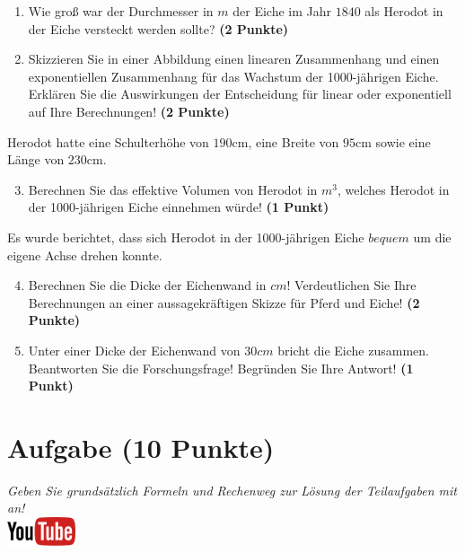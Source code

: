 \documentclass[a4paper, 9pt]{scrartcl}\usepackage[]{graphicx}\usepackage[]{xcolor}
\begin{document}
\begin{enumerate}
\item Wie gro{\ss} war der Durchmesser in $m$ der Eiche im Jahr $1840$ als
  Herodot in der Eiche versteckt werden sollte?
  \textbf{(2 Punkte)}
\item Skizzieren Sie in einer Abbildung einen linearen Zusammenhang und einen
exponentiellen Zusammenhang f{\"u}r das Wachstum der 1000-j{\"a}hrigen Eiche. Erkl{\"a}ren Sie die
Auswirkungen der Entscheidung f{\"u}r linear oder exponentiell auf Ihre
Berechnungen! \textbf{(2 Punkte)}
\end{enumerate}
 
Herodot hatte eine Schulterh{\"o}he von $190$cm, eine Breite von
$95$cm sowie eine L{\"a}nge von  $230$cm.

\begin{enumerate}
  \setcounter{enumi}{2}
\item Berechnen Sie das effektive Volumen von Herodot in $m^3$, welches
  Herodot in der 1000-j{\"a}hrigen Eiche einnehmen w{\"u}rde! \textbf{(1 Punkt)}
\end{enumerate}

Es wurde berichtet, dass sich Herodot in der 1000-j{\"a}hrigen Eiche
$bequem$ um die eigene Achse drehen konnte.

\begin{enumerate}
  \setcounter{enumi}{3}
\item Berechnen Sie die Dicke der Eichenwand in $cm$! Verdeutlichen Sie Ihre
  Berechnungen an einer aussagekr{\"a}ftigen Skizze f{\"u}r Pferd und Eiche! \textbf{(2 Punkte)} 
\item Unter einer Dicke der Eichenwand von $30cm$ bricht
  die Eiche zusammen. Beantworten Sie die Forschungsfrage! Begr{\"u}nden Sie
  Ihre Antwort! \textbf{(1 Punkt)} 
\end{enumerate}
 
\clearpage

\section{Aufgabe \hfill (10 Punkte)}

\textit{Geben Sie grunds{\"a}tzlich Formeln und Rechenweg zur L{\"o}sung der
  Teilaufgaben mit an!} \\[1Ex]

\hfill\href{https://youtu.be/57B-yYoFSk0}{\includegraphics[width =
  2cm]{img/youtube}} %
\hspace{2Ex}
\end{document}
